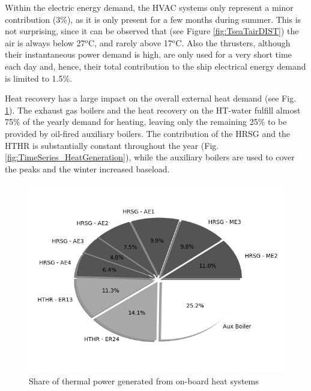 \documentclass[preprint,12pt]{elsarticle}
\begin{document}
Within the electric energy demand, the HVAC systems only represent a minor contribution (3\%), as it is only present for a few months during summer. This is not surprising, since it can be observed that (see Figure \ref{fig:TseaTairDIST}) the air is always below 27$^o$C, and rarely above 17$^o$C. Also the thrusters, although their instantaneous power demand is high, are only used for a very short time each day and, hence, their total contribution to the ship electrical energy demand is limited to 1.5\%. 

Heat recovery has a large impact on the overall external heat demand (see Fig.  \ref{fig:Pie_HeatGeneration}). The exhaust gas boilers and the heat recovery on the HT-water fulfill almost 75\% of the yearly demand for heating, leaving only the remaining 25\% to be provided by oil-fired auxiliary boilers. The contribution of the HRSG and the HTHR is substantially constant throughout the year (Fig. \ref{fig:TimeSeries_HeatGeneration}), while the auxiliary boilers are used to cover the peaks and the winter increased baseload. 

\begin{figure}
	\centering
	\includegraphics[width=0.99\linewidth]{Figures/Pie_HeatGeneration}
	\caption{Share of thermal power generated from on-board heat systems}
	\label{fig:Pie_HeatGeneration}
\end{figure}
\end{document}
